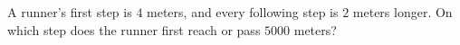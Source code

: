A runner's first step is $4$ meters, and every following step is $2$ meters longer. On which step does the runner first reach or pass $5000$ meters?
